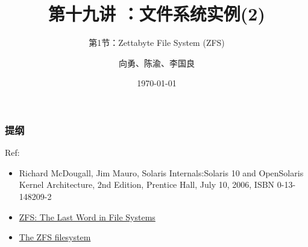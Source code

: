 


\title[第19讲]{第十九讲 ：文件系统实例(2)} %
\subtitle{第1节：Zettabyte File System (ZFS)}
\author{向勇、陈渝、李国良} %
\date{\today} %



\begin{frame}
\titlepage %
\end{frame}

\begin{frame}
\frametitle{提纲} %
\tableofcontents %

Ref:
    \begin{itemize}
        \item Richard McDougall, Jim Mauro, Solaris Internals:Solaris 10 and OpenSolaris Kernel Architecture, 2nd Edition, Prentice Hall, July 10, 2006, ISBN 0-13-148209-2
        \item \href{http://pages.cs.wisc.edu/~remzi/OSTEP/Citations/zfs_last.pdf}{ZFS: The Last Word in File Systems}
        \item \href{https://papers.freebsd.org/2020/linux.conf.au/paeps\_The_ZFS\_filesystem.files/paeps\_The\_ZFS\_filesystem.pdf}{The ZFS filesystem}
    \end{itemize}

\end{frame}
% 
% 
% 
% 
